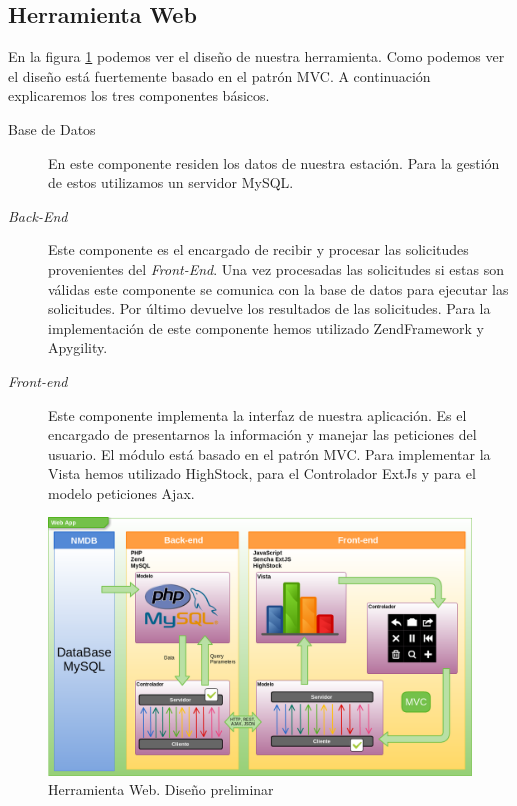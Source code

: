 	\subsection{Herramienta Web}
		En la figura \ref{fig:herramienta_web_preliminar} podemos ver el diseño de nuestra herramienta. Como podemos ver el diseño está
		fuertemente basado en el patrón MVC\cite{MVCWiki}. A continuación explicaremos los tres componentes básicos. 
		\begin{description}
			\item[Base de Datos]    
				En este componente residen los datos de nuestra estación. Para la gestión de estos utilizamos un servidor
				MySQL\cite{MySql}.
			\item[\emph{Back-End}]
				Este componente es el encargado de recibir y procesar las solicitudes provenientes del \emph{Front-End}. Una vez
				procesadas las solicitudes si estas son válidas este componente se comunica con la base de datos para ejecutar las
				solicitudes. Por último devuelve los resultados de las solicitudes. Para la implementación de este componente hemos
				utilizado ZendFramework\cite{ZF} y Apygility\cite{Apigility}.  
			\item[\emph{Front-end}] 
				Este componente implementa la interfaz de nuestra aplicación. Es el encargado de presentarnos la información y manejar
				las peticiones del usuario. El módulo está basado en el patrón MVC. Para implementar la Vista hemos utilizado
				HighStock\cite{HighStock}, para el Controlador ExtJs\cite{ExtJs} y para el modelo peticiones Ajax\cite{AjaxWiki}.
		\end{description}
		\begin{figure}[h]
			\centering
			\includegraphics[keepaspectratio, width=1\textwidth]{./img/herramienta_web_preliminar.png}
			\caption{Herramienta Web. Diseño preliminar}
			\label{fig:herramienta_web_preliminar}
		\end{figure}
